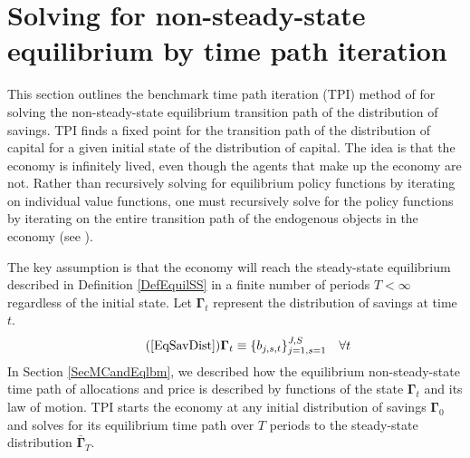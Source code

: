 \documentclass[letterpaper,12pt]{article}
\theoremstyle{definition}
\begin{document}
\newpage
\section{Solving for non-steady-state equilibrium by time path iteration}\label{AppNonSSsolve}

  \setcounter{equation}{0}

  This section outlines the benchmark time path iteration (TPI) method of \citet{AuerbachKotlikoff:1987} for solving the non-steady-state equilibrium transition path of the distribution of savings. TPI finds a fixed point for the transition path of the distribution of capital for a given initial state of the distribution of capital. The idea is that the economy is infinitely lived, even though the agents that make up the economy are not. Rather than recursively solving for equilibrium policy functions by iterating on individual value functions, one must recursively solve for the policy functions by iterating on the entire transition path of the endogenous objects in the economy (see \citet[ch. 17]{StokeyLucas:1989}).

  The key assumption is that the economy will reach the steady-state equilibrium described in Definition \ref{DefEquilSS} in a finite number of periods $T<\infty$ regardless of the initial state. Let $\bm{\Gamma}_t$ represent the distribution of savings at time $t$.
  \begin{equation}\tag{\ref{EqSavDist}}
    \bm{\Gamma}_t \equiv \{b_{j,s,t}\}_{j=1,s=1}^{J,S} \quad\forall t
  \end{equation}
  In Section \ref{SecMCandEqlbm}, we described how the equilibrium non-steady-state time path of allocations and price is described by functions of the state $\bm{\Gamma}_t$ and its law of motion. TPI starts the economy at any initial distribution of savings $\bm{\Gamma}_0$ and solves for its equilibrium time path over $T$ periods to the steady-state distribution $\bar{\bm{\Gamma}}_T$.
\end{document}

